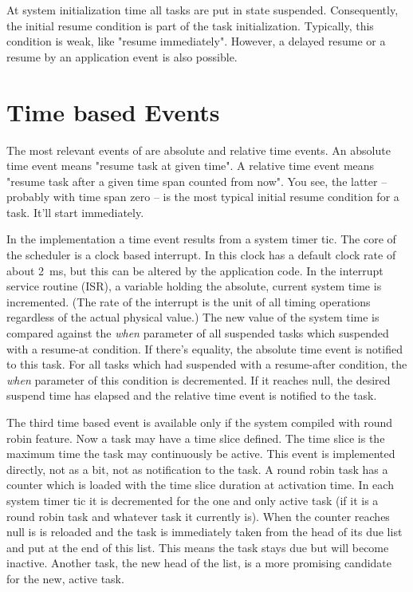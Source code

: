 At system initialization time all tasks are put in state suspended.
Consequently, the initial resume condition is part of the task
initialization. Typically, this condition is weak, like "resume
immediately". However, a delayed resume or a resume by an application
event is also possible. 


\section{Time based Events}
\label{secTimeBasedEvents}

The most relevant events of \rtos{} are absolute and relative time events.
An absolute time event means "resume task at given time". A relative time
event means "resume task after a given time span counted from now". You
see, the latter -- probably with time span zero -- is the most typical
initial resume condition for a task. It'll start immediately.

In the implementation a time event results from a system timer tic. The
core of the scheduler is a clock based interrupt. In \rtos{} this clock
has a default clock rate of about 2~ms, but this can be altered by the
application code. In the interrupt service routine (ISR), a variable
holding the absolute, current system time is incremented. (The rate of the
interrupt is the unit of all timing operations regardless of the actual
physical value.) The new value of the system time is compared against the
\emph{when} parameter of all suspended tasks which suspended with a
resume-at condition. If there's equality, the absolute time event is
notified to this task. For all tasks which had suspended with a
resume-after condition, the \emph{when} parameter of this condition is
decremented. If it reaches null, the desired suspend time has elapsed and
the relative time event is notified to the task.

The third time based event is available only if the system compiled with
round robin feature. Now a task may have a time slice defined. The time
slice is the maximum time the task may continuously be active. This event
is implemented directly, not as a bit, not as notification to the task. A
round robin task has a counter which is loaded with the time slice
duration at activation time. In each system timer tic it is decremented
for the one and only active task (if it is a round robin task and whatever
task it currently is). When the counter reaches null is is reloaded and
the task is immediately taken from the head of its due list and put at the
end of this list. This means the task stays due but will become inactive.
Another task, the new head of the list, is a more promising candidate for
the new, active task.

